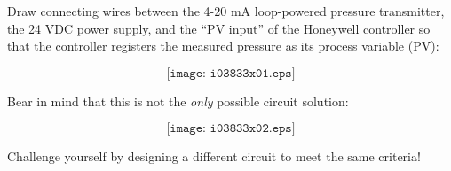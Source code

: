 

Draw connecting wires between the 4-20 mA loop-powered pressure transmitter, the 24 VDC power supply, and the ``PV input'' of the Honeywell controller so that the controller registers the measured pressure as its process variable (PV):

$$\texttt{[image: i03833x01.eps]}$$







Bear in mind that this is not the {\it only} possible circuit solution:

$$\texttt{[image: i03833x02.eps]}$$

Challenge yourself by designing a different circuit to meet the same criteria! 











